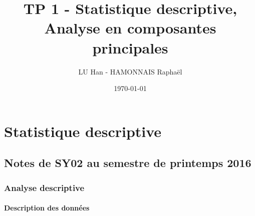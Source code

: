 \documentclass[a4paper,11pt]{report}
\title{TP 1 - Statistique descriptive, Analyse en composantes principales}
\author{LU Han - HAMONNAIS Raphaël}
\date{\today}
\begin{document}
\renewcommand{\labelitemi}{\large\textcolor{tatoebagreen}{\fg}}
\groovypdtitre
\restoregeometry %


\tableofcontents




\chapter{Statistique descriptive}

\section{Notes de SY02 au semestre de printemps 2016}

\subsection{Analyse descriptive}

\subsubsection{Description des données}
\end{document}
